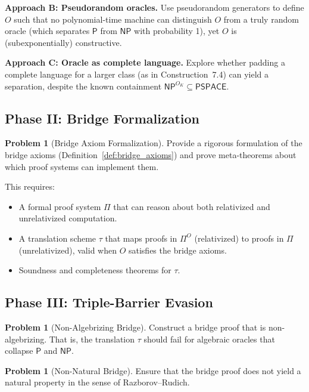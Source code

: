 \documentclass[11pt,a4paper]{article}
\theoremstyle{plain}
\theoremstyle{definition}
\newtheorem{problem}[theorem]{Problem}
\theoremstyle{remark}
\newcommand{\PP}{\mathsf{P}}
\newcommand{\NP}{\mathsf{NP}}
\newcommand{\PSPACE}{\mathsf{PSPACE}}
\begin{document}
\noindent\textbf{Approach B: Pseudorandom oracles.} Use pseudorandom generators
to define $O$ such that no polynomial-time machine can distinguish $O$ from a
truly random oracle (which separates $\PP$ from $\NP$ with probability 1), yet
$O$ is (subexponentially) constructive.

\noindent\textbf{Approach C: Oracle as complete language.} Explore whether
padding a complete language for a larger class (as in Construction~7.4) can
yield a separation, despite the known containment
$\NP^{O_K} \subseteq \PSPACE$.

\subsection{Phase II: Bridge Formalization}

\begin{problem}[Bridge Axiom Formalization]\label{prob:bridge}
Provide a rigorous formulation of the bridge axioms (Definition~\ref{def:bridge_axioms})
and prove meta-theorems about which proof systems can implement them.
\end{problem}

\noindent This requires:

\begin{itemize}
    \item A formal proof system $\Pi$ that can reason about both relativized and
    unrelativized computation.
    \item A translation scheme $\tau$ that maps proofs in $\Pi^O$ (relativized)
    to proofs in $\Pi$ (unrelativized), valid when $O$ satisfies the bridge
    axioms.
    \item Soundness and completeness theorems for $\tau$.
\end{itemize}

\subsection{Phase III: Triple-Barrier Evasion}

\begin{problem}[Non-Algebrizing Bridge]\label{prob:algebrize}
Construct a bridge proof that is non-algebrizing.  That is, the translation
$\tau$ should fail for algebraic oracles that collapse $\PP$ and $\NP$.
\end{problem}

\begin{problem}[Non-Natural Bridge]\label{prob:natural}
Ensure that the bridge proof does not yield a natural property in the sense of
Razborov--Rudich.
\end{problem}
\end{document}
